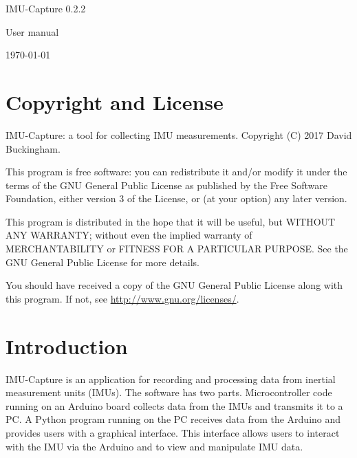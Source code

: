 \documentclass[11pt,letterpaper,article,oneside]{memoir}
\newcommand{\name}{IMU-Capture}
\newcommand{\programVersion}{0.2.2}
\begin{document}
\thispagestyle{empty}

{%
\centering
\Large

\vspace*{\fill}

{\huge
\name{} \programVersion{}
}

{\LARGE
User manual
}

\today

\vspace*{\fill}

}

\cleardoublepage

\tableofcontents*

\clearpage




\chapter{Copyright and License}

\name{}: a tool for collecting IMU measurements.
Copyright (C) 2017 David Buckingham.

This program is free software: you can redistribute it and/or modify
it under the terms of the GNU General Public License as published by
the Free Software Foundation, either version 3 of the License, or
(at your option) any later version.

This program is distributed in the hope that it will be useful,
but WITHOUT ANY WARRANTY; without even the implied warranty of
MERCHANTABILITY or FITNESS FOR A PARTICULAR PURPOSE.  See the
GNU General Public License for more details.

You should have received a copy of the GNU General Public License
along with this program.  If not, see \url{http://www.gnu.org/licenses/}.




\chapter{Introduction}

\name{} is an application for recording and processing data from inertial
measurement units (IMUs). The software has two parts. Microcontroller code
running on an Arduino board collects data from the IMUs and transmits it to a
PC. A Python program running on the PC receives data from the Arduino and
provides users with a graphical interface. This interface allows users to
interact with the IMU via the Arduino and to view and manipulate IMU data.
\end{document}
